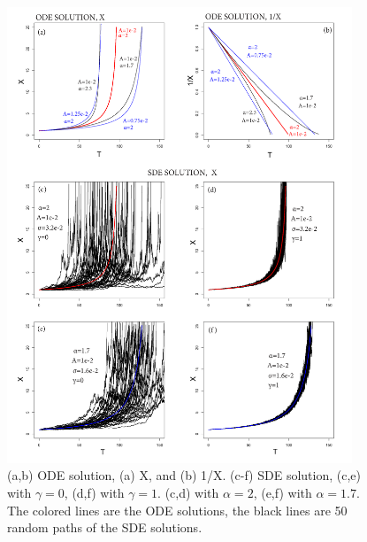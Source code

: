 \documentclass{article}
\begin{document}
\begin{figure}[H]
\centering
\includegraphics[width=0.92\textwidth]{Fig1_plusX.png}
\caption{(a,b) ODE solution, (a) X, and (b) 1/X. (c-f) SDE solution, (c,e) with $\gamma=0$, (d,f) with $\gamma=1$. (c,d) with $\alpha=2$, (e,f) with $\alpha=1.7$. The colored lines are the ODE solutions, the black lines are 50 random paths of the SDE solutions.}
\label{Fig1}
\end{figure}
\end{document}
